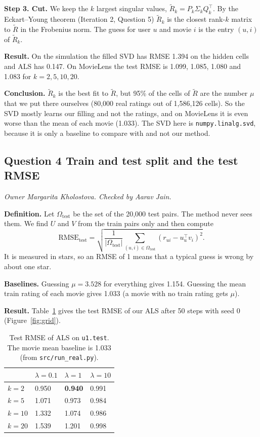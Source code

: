\textbf{Step 3. Cut.} We keep the $k$ largest singular values, $\tilde R_k = P_k \Sigma_k Q_k^\top$. By the Eckart--Young theorem (Iteration 2, Question 5) $\tilde R_k$ is the closest rank-$k$ matrix to $\tilde R$ in the Frobenius norm. The guess for user $u$ and movie $i$ is the entry $(u,i)$ of $\tilde R_k$.

\textbf{Result.} On the simulation the filled SVD has RMSE 1.394 on the hidden cells and ALS has 0.147. On MovieLens the test RMSE is 1.099, 1.085, 1.080 and 1.083 for $k = 2, 5, 10, 20$.

\textbf{Conclusion.} $\tilde R_k$ is the best fit to $\tilde R$, but 95\% of the cells of $\tilde R$ are the number $\mu$ that we put there ourselves (80{,}000 real ratings out of 1{,}586{,}126 cells). So the SVD mostly learns our filling and not the ratings, and on MovieLens it is even worse than the mean of each movie (1.033). The SVD here is \texttt{numpy.linalg.svd}, because it is only a baseline to compare with and not our method.

\subsection*{Question 4 Train and test split and the test RMSE}
\textit{Owner Margarita Kholostova. Checked by Aarav Jain.}

\textbf{Definition.} Let $\Omega_{\text{test}}$ be the set of the 20{,}000 test pairs. The method never sees them. We find $U$ and $V$ from the train pairs only and then compute
\[
\text{RMSE}_{\text{test}} = \sqrt{\frac{1}{|\Omega_{\text{test}}|} \sum_{(u,i) \in \Omega_{\text{test}}} \left(r_{ui} - u_u^\top v_i\right)^2 } .
\]
It is measured in stars, so an RMSE of 1 means that a typical guess is wrong by about one star.

\textbf{Baselines.} Guessing $\mu = 3.528$ for everything gives 1.154. Guessing the mean train rating of each movie gives 1.033 (a movie with no train rating gets $\mu$).

\textbf{Result.} Table~\ref{tab:grid} gives the test RMSE of our ALS after 50 steps with seed 0 (Figure~\ref{fig:grid}).

\begin{table}[h]
\centering
\begin{tabular}{llll}
\hline
 & $\lambda = 0.1$ & $\lambda = 1$ & $\lambda = 10$ \\
\hline
$k = 2$ & 0.950 & \textbf{0.940} & 0.991 \\
$k = 5$ & 1.071 & 0.973 & 0.984 \\
$k = 10$ & 1.332 & 1.074 & 0.986 \\
$k = 20$ & 1.539 & 1.201 & 0.998 \\
\hline
\end{tabular}
\caption{Test RMSE of ALS on \texttt{u1.test}. The movie mean baseline is 1.033 (from \texttt{src/run\_real.py}).}
\label{tab:grid}
\end{table}

